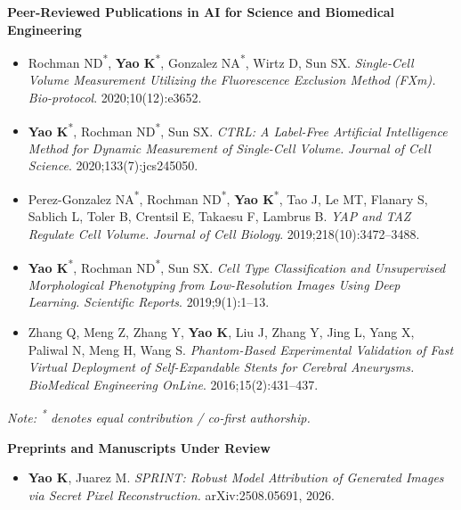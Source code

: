 \documentclass[10pt,a4paper]{article}
\begin{document}
\enlargethispage{1.2\baselineskip}
\textbf{Peer-Reviewed Publications in AI for Science and Biomedical Engineering}
\begin{itemize}
    \item Rochman ND\textsuperscript{*}, \textbf{Yao K}\textsuperscript{*}, Gonzalez NA\textsuperscript{*}, Wirtz D, Sun SX. \textit{Single-Cell Volume Measurement Utilizing the Fluorescence Exclusion Method (FXm).} \textit{Bio-protocol}. 2020;10(12):e3652.
    \item \textbf{Yao K}\textsuperscript{*}, Rochman ND\textsuperscript{*}, Sun SX. \textit{CTRL: A Label-Free Artificial Intelligence Method for Dynamic Measurement of Single-Cell Volume.} \textit{Journal of Cell Science}. 2020;133(7):jcs245050.
    \item Perez-Gonzalez NA\textsuperscript{*}, Rochman ND\textsuperscript{*}, \textbf{Yao K}\textsuperscript{*}, Tao J, Le MT, Flanary S, Sablich L, Toler B, Crentsil E, Takaesu F, Lambrus B. \textit{YAP and TAZ Regulate Cell Volume.} \textit{Journal of Cell Biology}. 2019;218(10):3472--3488.
    \item \textbf{Yao K}\textsuperscript{*}, Rochman ND\textsuperscript{*}, Sun SX. \textit{Cell Type Classification and Unsupervised Morphological Phenotyping from Low-Resolution Images Using Deep Learning.} \textit{Scientific Reports}. 2019;9(1):1--13.
    \item Zhang Q, Meng Z, Zhang Y, \textbf{Yao K}, Liu J, Zhang Y, Jing L, Yang X, Paliwal N, Meng H, Wang S. \textit{Phantom-Based Experimental Validation of Fast Virtual Deployment of Self-Expandable Stents for Cerebral Aneurysms.} \textit{BioMedical Engineering OnLine}. 2016;15(2):431--437.
\end{itemize}
\textit{Note: \textsuperscript{*} denotes equal contribution / co-first authorship.}

\textbf{Preprints and Manuscripts Under Review}
\begin{itemize}
    \item \textbf{Yao K}, Juarez M. \textit{SPRINT: Robust Model Attribution of Generated Images via Secret Pixel Reconstruction.} arXiv:2508.05691, 2026.
\end{itemize}

\end{document}

